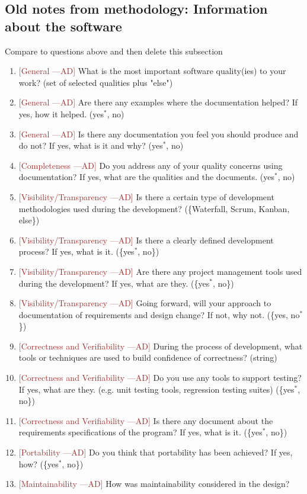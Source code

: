 \documentclass[12pt]{article}
\newcommand{\authornote}[3]{\textcolor{#1}{[#3 ---#2]}}
\newcommand{\authornote}[3]{}
\newcommand{\ad}[1]{\authornote{brown}{AD}{#1}} %
\begin{document}
\subsection{Old notes from methodology: Information about the software}
Compare to questions above and then delete this subsection

\begin{enumerate}
	\item \ad{General} What is the most important software quality(ies) to your
	work? (set of selected qualities plus "else")
	\item \ad{General} Are there any examples where the documentation helped? If
	yes, how it helped. ({yes$^*$, no})
	\item \ad{General} Is there any documentation you feel you should produce and do
	not? If yes, what is it and why? ({yes$^*$, no})
	\item \ad{Completeness} Do you address any of your quality concerns using
	documentation? If yes, what are the qualities and the documents. ({yes$^*$,
		no})
	\item \ad{Visibility/Transparency} Is there a certain type of development
	methodologies used during the development? (\{Waterfall, Scrum, Kanban,
	else\})
	\item \ad{Visibility/Transparency} Is there a clearly defined development
	process? If yes, what is it. (\{yes$^*$, no\})
	\item \ad{Visibility/Transparency} Are there any project management tools used
	during the development? If yes, what are they. (\{yes$^*$, no\})
	\item \ad{Visibility/Transparency} Going forward, will your approach to
	documentation of requirements and design change? If not, why not. (\{yes,
	no$^*$\})
	\item \ad{Correctness and Verifiability} During the process of development, what
	tools or techniques are used to build confidence of correctness? (string)
	\item \ad{Correctness and Verifiability} Do you use any tools to support
	testing? If yes, what are they. (e.g. unit testing tools, regression testing
	suites) (\{yes$^*$, no\})
	\item \ad{Correctness and Verifiability} Is there any document about the
	requirements specifications of the program? If yes, what is it. (\{yes$^*$,
	no\})
	\item \ad{Portability} Do you think that portability has been achieved? If yes,
	how? (\{yes$^*$, no\})
	\item \ad{Maintainability} How was maintainability considered in the design?

\end{enumerate}
\end{document}
